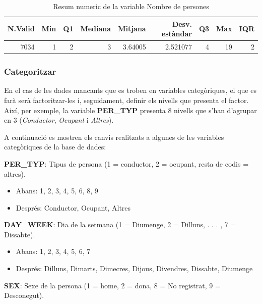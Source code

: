 \documentclass[11pt,longbibliography]{article}
\theoremstyle{definition}
\theoremstyle{remark}
\begin{document}
\begin{table}[H]
\centering
\begin{tabular}{|r|r|r|r|r|r|r|r|r|}
\hline
N.Valid & Min & Q1 & Mediana & Mitjana  & Desv. estàndar & Q3 & Max & IQR \\ \hline
7034    & 1   & 2  & 3       & 3.64005 & 2.521077       & 4  & 19  & 2   \\ \hline
\end{tabular}
\caption{Resum numeric de la variable Nombre de persones}
\label{tab:Fig2-table}
\end{table}

\subsubsection{Categoritzar}

En el cas de les dades mancants que es troben en variables categòriques, el que es farà serà factoritzar-les i, seguidament, definir els nivells que presenta el factor. Així, per exemple, la variable \textbf{PER\_TYP} presenta 8 nivells que s'han d'agrupar en 3 (\emph{Conductor}, \emph{Ocupant} i \emph{Altres}). 


A continuació es mostren els canvis realitzats a algunes de les variables categòriques de la base de dades:



\textbf{PER\_TYP}: Tipus de persona (1 = conductor, 2 = ocupant, resta de codis = altres).

\begin{itemize}

\item Abans: 1, 2, 3, 4, 5, 6, 8, 9

\item Després: Conductor, Ocupant, Altres

\end{itemize}


\textbf{DAY\_WEEK}: Dia de la setmana (1 = Diumenge, 2 = Dilluns, . . . , 7 = Dissabte).

\begin{itemize}

\item Abans: 1, 2, 3, 4, 5, 6, 7

\item Després: Dilluns, Dimarts, Dimecres, Dijous, Divendres, Dissabte, Diumenge

\end{itemize}

\textbf{SEX}: Sexe de la persona (1 = home, 2 = dona, 8 = No registrat, 9 = Desconegut).
\end{document}
